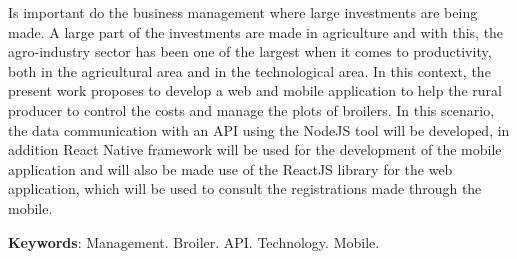 \begin{resumo}[ABSTRACT]
\begin{SingleSpacing}
Is important do the business management where large investments are being made. A large part of the investments are made in agriculture and with this, the agro-industry sector has been one of the largest when it comes to productivity, both in the agricultural area and in the technological area. In this context, the present work proposes to develop a web and mobile application to help the rural producer to control the costs and manage the plots of broilers. In this scenario, the data communication with an API using the NodeJS tool will be developed, in addition React Native framework will be used for the development of the mobile application and will also be made use of the ReactJS library for the web application, which will be used to consult the registrations made through the mobile.

\textbf{Keywords}: Management. Broiler. API. Technology. Mobile. 

\end{SingleSpacing}
\end{resumo}